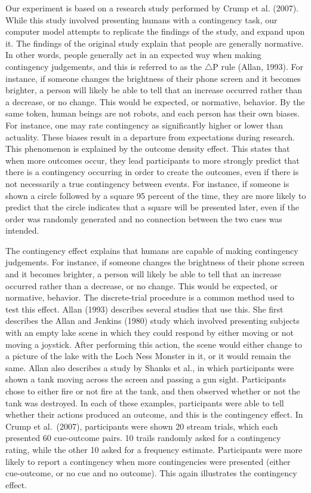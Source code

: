 \documentclass[
  english,
  man,floatsintext]{apa6}
\begin{document}
Our experiment is based on a research study performed by Crump et al. (2007). While this study involved presenting humans with a contingency task, our computer model attempts to replicate the findings of the study, and expand upon it. The findings of the original study explain that people are generally normative. In other words, people generally act in an expected way when making contingency judgements, and this is referred to as the \(\triangle\)P rule (Allan, 1993). For instance, if someone changes the brightness of their phone screen and it becomes brighter, a person will likely be able to tell that an increase occurred rather than a decrease, or no change. This would be expected, or normative, behavior. By the same token, human beings are not robots, and each person has their own biases. For instance, one may rate contingency as significantly higher or lower than actuality. These biases result in a departure from expectations during research. This phenomenon is explained by the outcome density effect. This states that when more outcomes occur, they lead participants to more strongly predict that there is a contingency occurring in order to create the outcomes, even if there is not necessarily a true contingency between events. For instance, if someone is shown a circle followed by a square 95 percent of the time, they are more likely to predict that the circle indicates that a square will be presented later, even if the order was randomly generated and no connection between the two cues was intended.

The contingency effect explains that humans are capable of making contingency judgements. For instance, if someone changes the brightness of their phone screen and it becomes brighter, a person will likely be able to tell that an increase occurred rather than a decrease, or no change. This would be expected, or normative, behavior. The discrete-trial procedure is a common method used to test this effect. Allan (1993) describes several studies that use this. She first describes the Allan and Jenkins (1980) study which involved presenting subjects with an empty lake scene in which they could respond by either moving or not moving a joystick. After performing this action, the scene would either change to a picture of the lake with the Loch Ness Monster in it, or it would remain the same. Allan also describes a study by Shanks et al., in which participants were shown a tank moving across the screen and passing a gun sight. Participants chose to either fire or not fire at the tank, and then observed whether or not the tank was destroyed. In each of these examples, participants were able to tell whether their actions produced an outcome, and this is the contingency effect. In Crump et al.~(2007), participants were shown 20 stream trials, which each presented 60 cue-outcome pairs. 10 trails randomly asked for a contingency rating, while the other 10 asked for a frequency estimate. Participants were more likely to report a contingency when more contingencies were presented (either cue-outcome, or no cue and no outcome). This again illustrates the contingency effect.
\end{document}

